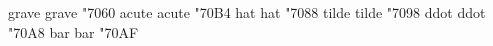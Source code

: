 
\redefinecommand grave   grave {\mathaccent"7060 }
\redefinecommand acute   acute {\mathaccent"70B4 }
\redefinecommand hat     hat   {\mathaccent"7088 }
\redefinecommand tilde   tilde {\mathaccent"7098 }
\redefinecommand ddot    ddot  {\mathaccent"70A8 }
\redefinecommand bar     bar   {\mathaccent"70AF }

\stopencoding

\endinput
